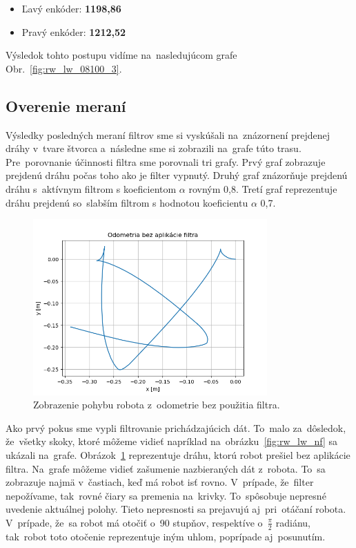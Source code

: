 \begin{itemize}
	\item Ľavý enkóder: \textbf{1198,86}
	\item Pravý enkóder: \textbf{1212,52}
\end{itemize}

Výsledok tohto postupu vidíme na~nasledujúcom grafe Obr.~\ref{fig:rw_lw_08100_3}.

\clearpage

\subsection{Overenie meraní}
\label{subsec:overenie_merani}

Výsledky posledných meraní filtrov sme si vyskúšali na~znázornení prejdenej dráhy v~tvare štvorca a~následne sme si
zobrazili na~grafe túto trasu. Pre~porovnanie účinnosti filtra sme porovnali tri grafy. Prvý graf zobrazuje prejdenú
dráhu počas toho ako je filter vypnutý. Druhý graf znázorňuje prejdenú dráhu s~aktívnym filtrom s koeficientom $\alpha$
rovným 0,8. Tretí graf reprezentuje dráhu prejdenú so~slabším filtrom s hodnotou koeficientu $\alpha$ 0,7.

\begin{figure}[!htbp]
	\begin{center}
		\includegraphics[width=0.8\textwidth]{img/stvorec_bez_filtra.png}
	\end{center}
	\caption{Zobrazenie pohybu robota z~odometrie bez použitia filtra.}
	\label{fig:stvorecBezFiltra}
\end{figure}

Ako prvý pokus sme vypli filtrovanie prichádzajúcich dát. To~malo za~dôsledok, že~všetky skoky, ktoré môžeme vidieť
napríklad na~obrázku~\ref{fig:rw_lw_nf} sa ukázali na~grafe. Obrázok~\ref{fig:stvorecBezFiltra} reprezentuje
dráhu, ktorú robot prešiel bez aplikácie filtra. Na~grafe môžeme vidieť zašumenie nazbieraných dát z~robota. To~sa
zobrazuje najmä v~častiach, keď má robot isť rovno. V~prípade, že~filter nepožívame, tak~rovné čiary sa premenia
na~krivky. To~spôsobuje nepresné uvedenie aktuálnej polohy. Tieto nepresnosti sa prejavujú aj~pri~otáčaní robota.
V~prípade, že~sa robot má otočiť o~90 stupňov, respektíve o~$\frac{\pi}{2}$ radiánu, tak~robot toto otočenie
reprezentuje iným uhlom, poprípade aj~posunutím.

